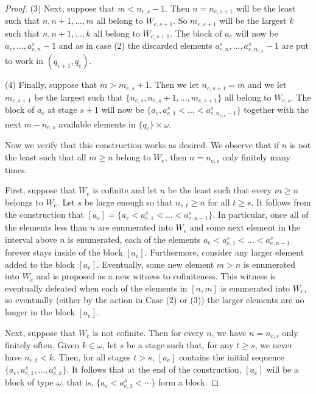 \documentclass[11pt]{amsart}
\theoremstyle{definition}
\begin{document}
\begin{proof}
\medskip 

(3) Next, suppose that $m < n_{e,s} - 1$.  Then $n = n_{e,s+1}$ will be the least such that $n,n+1,\dots,m$ all belong to $W_{e,s+1}$. So $m_{e,s+1}$ will be the largest $k$ such that $n,n+1,\dots,k$ all belong to $W_{e,s+1}$. The block of $a_e$ will now be $a_e,\dots,a^s_{e,n}-1$ and as in case (2) the discarded elements $a^s_{e,n}, \dots, a^s_{e,n_{e,s}}-1$ are put to work in $(q_{e+1},q_e)$.

\medskip

(4) Finally, suppose that $m > m_{e,s}+1$. Then we let $n_{e,s+1} = m$ and we let  $m_{e,s+1}$ be the largest such that 
$\{n_{e,s},n_{e,s}+1,\dots,m_{e,s+1}\}$ all belong to $W_{e,s}$. The block of $a_e$ at stage $s+1$ will now be 
$\{a_e, a^s_{e,1} < \dots < a^s_{e,n_{e,s}-1}\}$ together with the next $m - n_{e,s}$ available elements in $\{q_e\} \times \omega$. 

\medskip

Now we verify that this construction works as desired. 
We observe that if $n$ is not the least such that all $m \geq n$ belong to $W_e$, then $n = n_{e,s}$ only finitely many times. 

First, suppose that $W_e$ is cofinite and let $n$ be the least such that every $m\geq n$ belongs to $W_e$. Let $s$ be large enough so that $n_{e,t} \geq n$ 
for all $t \geq s$.  It follows from the construction that $[a_e] =  
\{a_e < a^s_{e,1} < \dots < a^s_{e,n-1}\}$.
In particular, once all of the elements less than $n$ are enumerated into $W_e$ and some next element in the interval above $n$ is enumerated, each of the elements $a_e < a^s_{e,1} < \dots < a^s_{e,n-1}$ forever stays inside of the block $[a_e]$.
Furthermore, consider any larger element added to the block $[a_e]$.
Eventually, some new element $m>n$ is enumerated into $W_e$ and is proposed as a new witness to cofiniteness.
This witness is eventually defeated when each of the elements in $[n,m]$ is enumerated into $W_e$, so eventually (either by the action in Case (2) or (3)) the larger elements are no longer in the block $[a_e]$.

Next, suppose that $W_e$ is not cofinite. Then for every $n$, we have $n = n_{e,s}$ only finitely often. Given $k \in \omega$, let $s$ be a stage such that, for any $t \geq s$, we never have $n_{e,t} < k$. Then, for all stages $t > s$, $[a_e]$ contains the initial sequence $\{a_e, a^s_{e,1}, \dots, a^s_{e,k}\}$. It follows that at the end of the construction,  $[a_e]$ will be a block of type $\omega$, 
that is, $\{a_e < a^s_{e,1} < \cdots\}$ form a block.
\end{proof}
\end{document}
